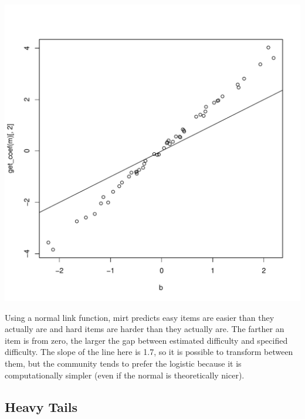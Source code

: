 \documentclass{article}\usepackage[]{graphicx}\usepackage[]{color}
\makeatletter
\def\maxwidth{ %
  \ifdim\Gin@nat@width>\linewidth
    \linewidth
  \else
    \Gin@nat@width
  \fi
}
\newenvironment{knitrout}{}{} %
\makeatother
\begin{document}
\begin{knitrout}
\color{fgcolor}
\includegraphics[width=\maxwidth]{figure/unnamed-chunk-10-1} 

\end{knitrout}

Using a normal link function, mirt predicts easy items are easier than they actually are and hard items are harder than they actually are.  The farther an item is from zero, the larger the gap between estimated difficulty and specified difficulty.  The slope of the line here is 1.7, so it is possible to transform between them, but the community tends to prefer the logistic because it is computationally simpler (even if the normal is theoretically nicer).

\subsection{Heavy Tails}
\end{document}
